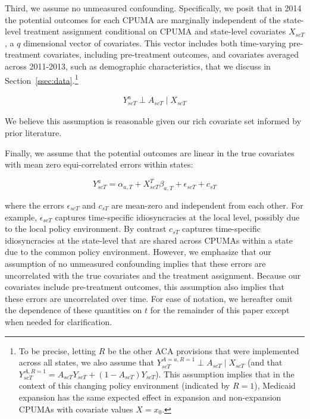 \documentclass[aoas]{imsart}
\theoremstyle{plain}
\theoremstyle{remark}
\begin{document}
Third, we assume no unmeasured confounding. Specifically, we posit that in 2014 the potential outcomes for each CPUMA are marginally independent of the state-level treatment assignment conditional on CPUMA and state-level covariates $X_{scT}$, a $q$ dimensional vector of covariates. This vector includes both time-varying pre-treatment covariates, including pre-treatment outcomes, and covariates averaged across 2011-2013, such as demographic characteristics, that we discuss in Section~\ref{ssec:data}.\footnote{To be precise, letting $R$ be the other ACA provisions that were implemented across all states, we also assume that $Y^{A = a, R = 1}_{scT} \perp A_{scT} \mid X_{scT}$ (and that $Y_{scT}^{A, R = 1} = A_{scT}Y_{scT} + (1 - A_{scT})Y_{scT}$). This assumption implies that in the context of this changing policy environment (indicated by $R = 1$), Medicaid expansion has the same expected effect in expansion and non-expansion CPUMAs with covariate values $X = x_0$.}

\begin{align*}
Y_{scT}^a \perp A_{scT} \mid X_{scT}
\end{align*}

We believe this assumption is reasonable given our rich covariate set informed by prior literature. 

Finally, we assume that the potential outcomes are linear in the true covariates with mean zero equi-correlated errors within states:

\begin{equation}\label{eqn:linmod}
Y_{scT}^a = \alpha_{a, T} + X_{scT}^T\beta_{a, T} + \epsilon_{scT} + c_{sT}
\end{equation}

where the errors $\epsilon_{scT}$ and $c_{sT}$ are mean-zero and independent from each other. For example, $\epsilon_{scT}$ captures time-specific idiosyncracies at the local level, possibly due to the local policy environment. By contrast $c_{sT}$ captures time-specific idiosyncracies at the state-level that are shared across CPUMAs within a state due to the common policy environment. However, we emphasize that our assumption of no unmeasured confounding implies that these errors are uncorrelated with the true covariates and the treatment assignment. Because our covariates include pre-treatment outcomes, this assumption also implies that these errors are uncorrelated over time. For ease of notation, we hereafter omit the dependence of these quantities on $t$ for the remainder of this paper except when needed for clarification.
\end{document}
